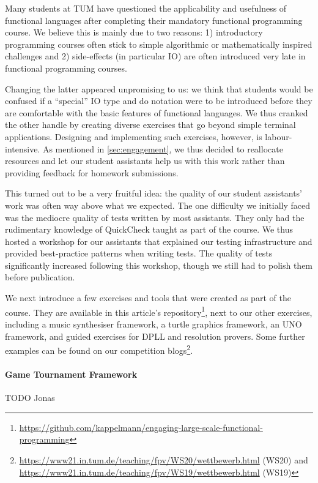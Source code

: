 Many students at TUM have questioned the
applicability and usefulness
of functional languages after completing
their mandatory functional programming course.
We believe this is mainly due to two reasons:
1) introductory programming courses often stick
to simple algorithmic or mathematically inspired challenges and
2) side-effects (in particular IO)
are often introduced very late
in functional programming courses.

Changing the latter appeared unpromising to us:
we think that students would be confused
if a ``special'' IO type and do notation were to
be introduced before they are comfortable
with the basic features of functional
languages.
We thus cranked the other handle
by creating diverse exercises that go beyond
simple terminal applications.
Designing and implementing such exercises,
however, is labour-intensive.
As mentioned in \cref{sec:engagement},
we thus decided to reallocate resources and
let our student assistants help us with this work
rather than providing feedback for homework submissions.

This turned out to be a very fruitful idea:
the quality of our student assistants' work was often way above what
we expected.
The one difficulty we initially faced was the mediocre quality of
tests written by most assistants.
They only had the rudimentary knowledge of QuickCheck taught as part of
the course.
We thus hosted a workshop for our assistants that explained
our testing infrastructure and provided best-practice
patterns when writing tests.
The quality of tests significantly increased following this workshop,
though we still had to polish them before publication.

We next introduce a few exercises and tools
that were created as part of the course.
They are available in this article's repository\footnote{\url{https://github.com/kappelmann/engaging-large-scale-functional-programming}},
next to our other exercises, including
a music synthesiser framework,
a turtle graphics framework,
an UNO framework,
and guided exercises for DPLL and resolution provers.
Some further examples can be found on our competition blogs\footnote{\url{https://www21.in.tum.de/teaching/fpv/WS20/wettbewerb.html} (WS20) and
\url{https://www21.in.tum.de/teaching/fpv/WS19/wettbewerb.html} (WS19)}.

\paragraph{Game Tournament Framework}
TODO Jonas

